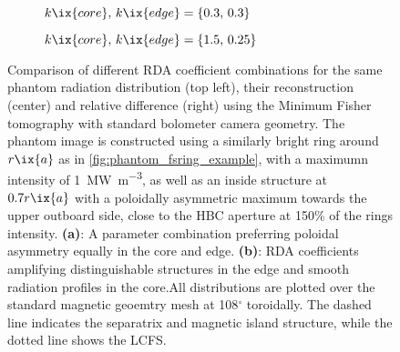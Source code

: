                 \begin{figure}[t]%
                    \centering%
                    \begin{subfigure}{\textwidth}%
                        \centering%
                        \caption{$k\ix{core},\,k\ix{edge}=\left\{0.3,\,0.3\right\}$}%
                    \end{subfigure}%
                    \newline%
                    \begin{subfigure}{\textwidth}%
                        \centering%
                        \caption{$k\ix{core},\,k\ix{edge}=\left\{1.5,\,0.25\right\}$}%
                    \end{subfigure}%
                    \caption{%
                        Comparison of different RDA coefficient combinations for the same phantom radiation distribution (top left), their reconstruction (center) and relative difference (right) using the Minimum Fisher tomography with standard bolometer camera geometry. The phantom image is constructed using a similarly bright ring around $r\ix{a}$ as in \cref{fig:phantom_fsring_example}, with a maximumn intensity of \SI{1}{\mega\watt\per\cubic\meter}, as well as an inside structure at $0.7r\ix{a}$ with a poloidally asymmetric maximum towards the upper outboard side, close to the HBC aperture at 150\% of the rings intensity. \textbf{(a)}: A parameter combination preferring poloidal asymmetry equally in the core and edge. \textbf{(b)}: RDA coefficients amplifying distinguishable structures in the edge and smooth radiation profiles in the core.All distributions are plotted over the standard magnetic geoemtry mesh at 108$^{\circ}$ toroidally. The dashed line indicates the separatrix and magnetic island structure, while the dotted line shows the LCFS.}\label{fig:phantom_fsring_asym_180deg_2D}%
                \end{figure}%
%
